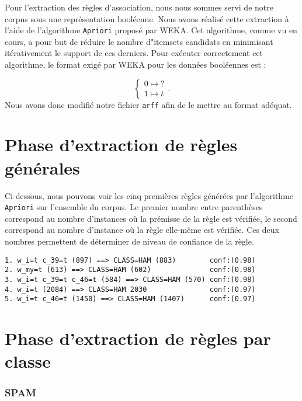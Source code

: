 Pour l'extraction des règles d'association, nous nous sommes servi de notre corpus sous une représentation booléenne. Nous avons réalisé cette extraction à l'aide de l'algorithme \texttt{Apriori} proposé par WEKA. Cet algorithme, comme vu en cours, a pour but de réduire le nombre d"\og itemsets \fg{} candidats en minimisant itérativement le support de ces derniers. Pour exécuter correctement cet algorithme, le format exigé par WEKA pour les données booléennes est : 

\begin{displaymath}
\begin{cases}
      0 \mapsto ? \\
      1 \mapsto t
\end{cases}.
\end{displaymath} 
Nous avons donc modifié notre fichier \texttt{arff} afin de le mettre au format adéquat. 



\section{Phase d'extraction de règles générales}

Ci-dessous, nous pouvons voir les cinq premières règles générées par l'algorithme \texttt{Apriori} sur l'ensemble du corpus. Le premier nombre entre parenthèses correspond au nombre d'instances où la prémisse de la règle est vérifiée, le second correspond au nombre d'instance où la règle elle-même est vérifiée. Ces deux nombres permettent de déterminer de niveau de confiance de la règle. 

\begin{verbatim}
1. w_i=t c_39=t (897) ==> CLASS=HAM (883)        conf:(0.98)
2. w_my=t (613) ==> CLASS=HAM (602)              conf:(0.98)
3. w_i=t c_39=t c_46=t (584) ==> CLASS=HAM (570) conf:(0.98)
4. w_i=t (2084) ==> CLASS=HAM 2030               conf:(0.97)
5. w_i=t c_46=t (1450) ==> CLASS=HAM (1407)      conf:(0.97)
\end{verbatim}

\section{Phase d'extraction de règles par classe}

\subsubsection{SPAM}

